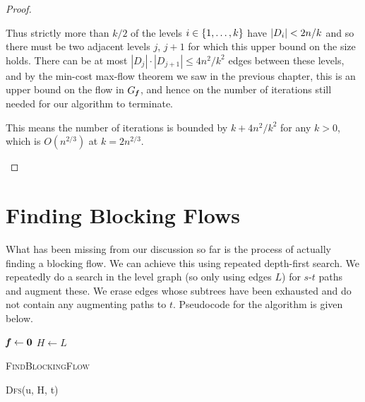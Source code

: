\begin{proof}
\begin{enumerate}
    Thus strictly more than $k/2$ of the levels $i \in \left\{1,\ldots,k \right\}$
    have $\left|D_i \right| < 2n/k$ and so there must be two adjacent levels $j$, $j+1$
    for which this upper bound on the size holds.
    There can be at most
    $|D_j|\cdot|D_{j+1}| \leq 4n^2/k^2$ edges between these levels, and by the min-cost
    max-flow theorem we saw in the previous chapter, this is an upper bound on the flow
    in $G_{\boldsymbol{\mathit{f}}}$, and hence on the number of iterations still needed for our algorithm to
    terminate.

    This means the number of iterations is bounded by $k + 4n^2/k^2$ for any $k>0$,
    which is $O(n^{2/3})$ at $k=2n^{2/3}$.
  \end{enumerate}
\end{proof}

\section{Finding Blocking Flows}
 \label{sec:findBlockingFlows} 
What has been missing from our discussion so far is the process of actually finding a blocking flow.
We can achieve this using repeated depth-first search. We repeatedly do a search in the level graph (so
only using edges $L$) for $s$-$t$ paths and augment these. We erase edges whose subtrees have been
exhausted and do not contain any augmenting paths to $t$. Pseudocode for the algorithm is given below.

\begin{algorithm}[H]
  \SetAlgoLined
  $\boldsymbol{\mathit{f}} \leftarrow \boldsymbol{0}$\;
  $H \leftarrow L$\;
  \caption{\textsc{FindBlockingFlow}}
\end{algorithm}

\begin{algorithm}[H]
  \SetAlgoLined
  \Return{$\emptyset$}\;
  \caption{\textsc{Dfs}(u, H, t)}
\end{algorithm}

